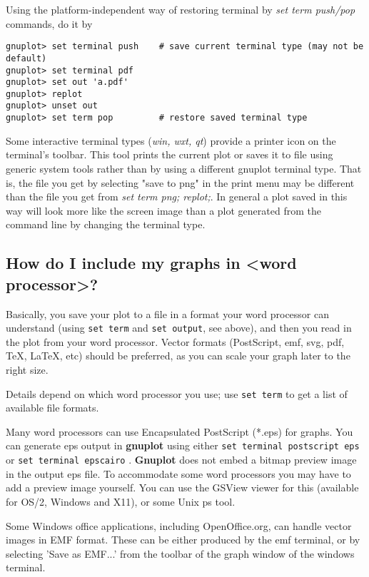 \documentclass[a4paper,11pt]{article}
\newcommand{\gnuplot}{\textbf{gnuplot }}
\newcommand{\Gnuplot}{\textbf{Gnuplot }}
\begin{document}
Using the platform-independent way of restoring terminal by \textit{set term
push/pop} commands, do it by
\small
\begin{verbatim}
gnuplot> set terminal push    # save current terminal type (may not be default)
gnuplot> set terminal pdf
gnuplot> set out 'a.pdf'
gnuplot> replot
gnuplot> unset out
gnuplot> set term pop         # restore saved terminal type
\end{verbatim}
\normalsize

Some interactive terminal types (\textit{win, wxt, qt}) provide a printer icon
on the terminal's toolbar. This tool prints the current plot or saves it to file
using generic system tools rather than by using a different gnuplot terminal type.
That is, the file you get by selecting "save to png" in the print menu may be
different than the file you get from \textit{set term png; replot;}.
In general a plot saved in this way will look more like the screen image than
a plot generated from the command line by changing the terminal type.


\subsection{How do I include my graphs in <word processor>?}

Basically, you save your plot to a file in a format your word
processor can understand (using \verb+set term+ and \verb+set output+,
see above), and then you read in the plot from your word processor. Vector
formats (PostScript, emf, svg, pdf, \TeX{}, \LaTeX{}, etc) should be preferred,
as you can scale your graph later to the right size.

Details depend on which word processor you use; use \verb+set term+ to get a
list of available file formats.

Many word processors can use Encapsulated PostScript (*.eps) for graphs. 
You can generate eps output in \gnuplot using either
\verb+set terminal postscript eps+
or
\verb+set terminal epscairo+
.
\Gnuplot does not embed a bitmap preview image in the output eps file.
To accommodate some word processors you may have to add a preview image yourself.
You can use the GSView viewer for this (available for OS/2, Windows and X11),
or some Unix ps tool.

Some Windows office applications, including OpenOffice.org, can handle
vector images in EMF format. These can be either produced by the emf 
terminal, or by selecting 'Save as EMF...' from the toolbar of the graph
window of the windows terminal.
\end{document}
